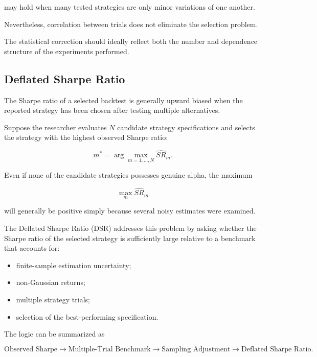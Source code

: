 \documentclass[11pt,a4paper]{article}
\begin{document}
may hold when many tested strategies are only minor variations of one another.

Nevertheless, correlation between trials does not eliminate the selection
problem.

The statistical correction should ideally reflect both the number and
dependence structure of the experiments performed.


\subsection{Deflated Sharpe Ratio}
\label{subsec:deflated_sharpe_ratio}

The Sharpe ratio of a selected backtest is generally upward biased when the
reported strategy has been chosen after testing multiple alternatives.

Suppose the researcher evaluates $N$ candidate strategy specifications and
selects the strategy with the highest observed Sharpe ratio:

\begin{equation}
m^*
=
\arg\max_{m=1,\ldots,N}
\widehat{SR}_m.
\end{equation}

Even if none of the candidate strategies possesses genuine alpha, the maximum

\begin{equation}
\max_m \widehat{SR}_m
\end{equation}

will generally be positive simply because several noisy estimates were examined.

The Deflated Sharpe Ratio (DSR) addresses this problem by asking whether the
Sharpe ratio of the selected strategy is sufficiently large relative to a
benchmark that accounts for:

\begin{itemize}
    \item finite-sample estimation uncertainty;
    \item non-Gaussian returns;
    \item multiple strategy trials;
    \item selection of the best-performing specification.
\end{itemize}

The logic can be summarized as

\begin{equation}
\boxed{
\text{Observed Sharpe}
\rightarrow
\text{Multiple-Trial Benchmark}
\rightarrow
\text{Sampling Adjustment}
\rightarrow
\text{Deflated Sharpe Ratio}.
}
\end{equation}
\end{document}

